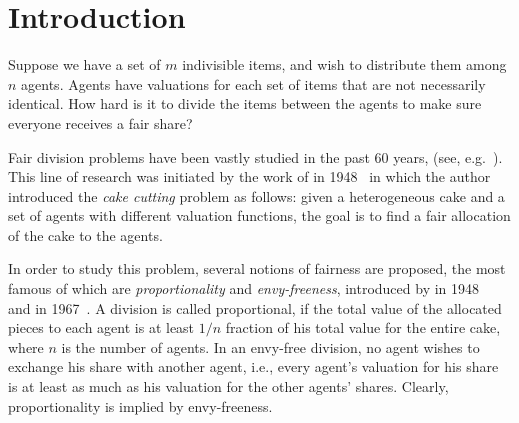 \section{Introduction}\label{introduction}
Suppose we have a set of $m$ indivisible items, and wish to distribute them among $n$ agents. Agents have  valuations for each set of items that are not necessarily identical. How hard is it to divide the items between the agents to make sure everyone receives a fair share?

\setcounter{page}{1}
Fair division problems have been vastly studied in the past 60 years, (see, e.g.~\cite{amanatidis2015approximation,asadpour2010approximation, Bouveret:first,Budish:first, Dubins:first,Procaccia:first,Steinhaus:first,alijani2017envy}). This line of research was initiated by the work of {\steinhausfirst}   in 1948~\cite{Steinhaus:first} in which the author introduced the \emph{cake cutting} problem as follows: given a heterogeneous cake and a set of agents with different valuation functions, the goal is to find a fair allocation of the cake to the agents.

In order to study this problem, several notions of fairness are proposed, the most famous of which are \emph{proportionality} and \emph{envy-freeness}, introduced by {\steinhausfirst} in 1948~\cite{Steinhaus:first} and {\foleyfirst} in 1967~\cite{Foley:first}. A division is called proportional, if the total value of the allocated pieces to each agent is at least $1/n$ fraction of his total value for the entire cake, where $n$ is the number of agents. In an envy-free division, no agent wishes to exchange his share with another agent, i.e., every agent's valuation for his share is at least as much as his valuation for the other agents' shares. Clearly, proportionality is implied by envy-freeness.%

